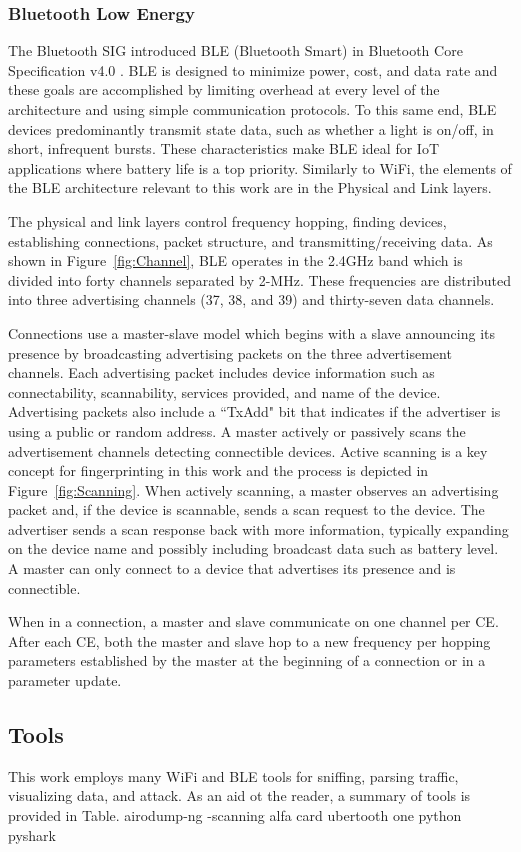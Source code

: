 \subsubsection{Bluetooth Low Energy}
The Bluetooth \ac{SIG} introduced \ac{BLE} (Bluetooth Smart) in Bluetooth Core Specification v4.0 \cite{sig4.0}. \ac{BLE} is designed to minimize power, cost, and data rate and these goals are accomplished by limiting overhead at every level of the architecture and using simple communication protocols. To this same end, \ac{BLE} devices predominantly transmit state data, such as whether a light is on/off, in short, infrequent bursts. These characteristics make \ac{BLE} ideal for \ac{IoT} applications where battery life is a top priority. Similarly to WiFi, the elements of the \ac{BLE} architecture relevant to this work are in the Physical and Link layers.

The physical and link layers control frequency hopping, finding devices, establishing connections, packet structure, and transmitting/receiving data. As shown in Figure~\ref{fig:Channel}, \ac{BLE} operates in the 2.4GHz band which is divided into forty channels separated by 2-MHz. These frequencies are distributed into three advertising channels (37, 38, and 39) and thirty-seven data channels. 

\figChannel

Connections use a master-slave model which begins with a slave announcing its presence by broadcasting advertising packets on the three advertisement channels. Each advertising packet includes device information such as connectability, scannability, services provided, and name of the device. Advertising packets also include a ``TxAdd" bit that indicates if the advertiser is using a public or random address. A master actively or passively scans the advertisement channels detecting connectible devices. Active scanning is a key concept for fingerprinting in this work and the process is depicted in Figure~\ref{fig:Scanning}. When actively scanning, a master observes an advertising packet and, if the device is scannable, sends a scan request to the device. The advertiser sends a scan response back with more information, typically expanding on the device name and possibly including broadcast data such as battery level. A master can only connect to a device that advertises its presence and is connectible.

\figScanning

When in a connection, a master and slave communicate on one channel per \ac{CE}. After each \ac{CE}, both the master and slave hop to a new frequency per hopping parameters established by the master at the beginning of a connection or in a parameter update.

\subsection{Tools}
This work employs many WiFi and \ac{BLE} tools for sniffing, parsing traffic, visualizing data, and attack. As an aid ot the reader, a summary of tools is provided in Table. 
airodump-ng -scanning
alfa card
ubertooth one
python
pyshark